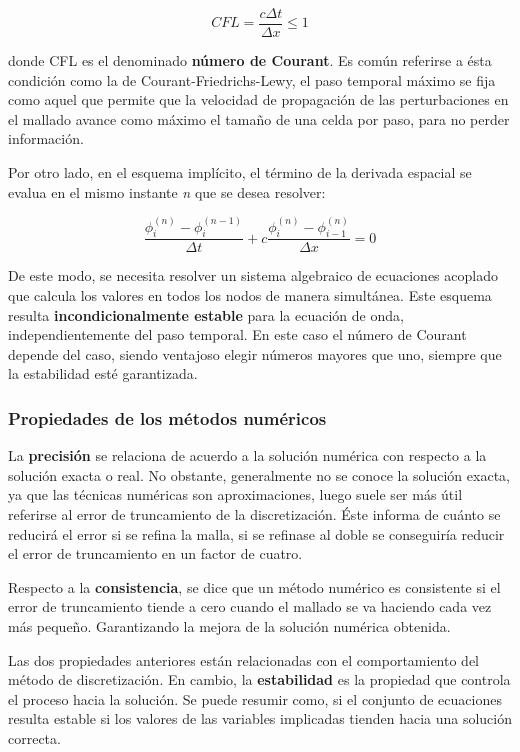 \[CFL=\frac{c\Delta t}{\Delta x}\leq 1\]

donde CFL es el denominado \textbf{número de Courant}. Es común
referirse a ésta condición como la de Courant-Friedrichs-Lewy, el paso
temporal máximo se fija como aquel que permite que la velocidad de
propagación de las perturbaciones en el mallado avance como máximo el
tamaño de una celda por paso, para no perder información.

Por otro lado, en el esquema implícito, el término de la derivada
espacial se evalua en el mismo instante \emph{n} que se desea resolver:

\[\frac{\phi_i^{(n)}-\phi_i^{(n-1)}}{\Delta t}+c\frac{\phi_i^{(n)}-\phi_{i-1}^{(n)}}{\Delta x}=0\]

De este modo, se necesita resolver un sistema algebraico de ecuaciones
acoplado que calcula los valores en todos los nodos de manera
simultánea. Este esquema resulta \textbf{incondicionalmente estable}
para la ecuación de onda, independientemente del paso temporal. En este
caso el número de Courant depende del caso, siendo ventajoso elegir
números mayores que uno, siempre que la estabilidad esté garantizada.

\subsubsection{Propiedades de los métodos numéricos}\label{header-n244}

La \textbf{precisión} se relaciona de acuerdo a la solución numérica con
respecto a la solución exacta o real. No obstante, generalmente no se
conoce la solución exacta, ya que las técnicas numéricas son
aproximaciones, luego suele ser más útil referirse al error de
truncamiento de la discretización. Éste informa de cuánto se reducirá el
error si se refina la malla, si se refinase al doble se conseguiría
reducir el error de truncamiento en un factor de cuatro.

Respecto a la \textbf{consistencia}, se dice que un método numérico es
consistente si el error de truncamiento tiende a cero cuando el mallado
se va haciendo cada vez más pequeño. Garantizando la mejora de la
solución numérica obtenida.

Las dos propiedades anteriores están relacionadas con el comportamiento
del método de discretización. En cambio, la \textbf{estabilidad} es la
propiedad que controla el proceso hacia la solución. Se puede resumir
como, si el conjunto de ecuaciones resulta estable si los valores de las
variables implicadas tienden hacia una solución correcta.

